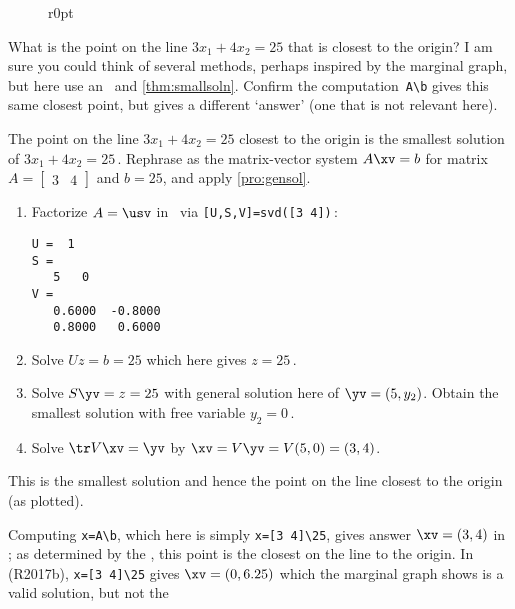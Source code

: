 \begin{wrapfigure}r{0pt}
\end{wrapfigure}
\begin{example} 
What is the point on the line \(3x_1+4x_2=25\) that is closest to the origin?
I am sure you could think of several methods, perhaps inspired by the marginal graph, but here use an \svd\ and \cref{thm:smallsoln}.
Confirm the \script[2] computation~\verb|A\b| gives this same closest point, but \script[1] gives a different `answer' (one that is not relevant here).

\begin{solution} 
The point on the line \(3x_1+4x_2=25\) closest to the origin is the smallest solution of \(3x_1+4x_2=25\)\,.  
Rephrase as the matrix-vector system \(A\xv=b\) for matrix \(A=\begin{bmatrix} 3&4 \end{bmatrix}\) and \(b=25\), and apply \cref{pro:gensol}.
\begin{enumerate}
\item Factorize \(A=\usv\) in \script\ via \verb|[U,S,V]=svd([3 4])|\,:
\begin{verbatim}
U =  1
S =
   5   0
V =
   0.6000  -0.8000
   0.8000   0.6000
\end{verbatim}
\item Solve \(Uz=b=25\) which here gives \(z=25\)\,.
\item Solve \(S\yv=z=25\) with general solution here of \(\yv=(5,y_2)\). 
Obtain the smallest solution with free variable \(y_2=0\)\,.
\item Solve \(\tr V\xv=\yv\) by \(\xv=V\yv=V(5,0)=(3,4)\).  
\end{enumerate}
This is the smallest solution and hence the point on the line closest to the origin (as plotted).

Computing \verb|x=A\b|, which here is simply \verb|x=[3 4]\25|, gives answer \(\xv=(3,4)\) in \script[2]; as determined by the \svd, this point is the closest on the line to the origin.
In \script[1] (R2017b), \verb|x=[3 4]\25| gives \(\xv=(0,6.25)\) which the marginal graph shows is a valid solution, but not the 
\end{solution}
\end{example}





